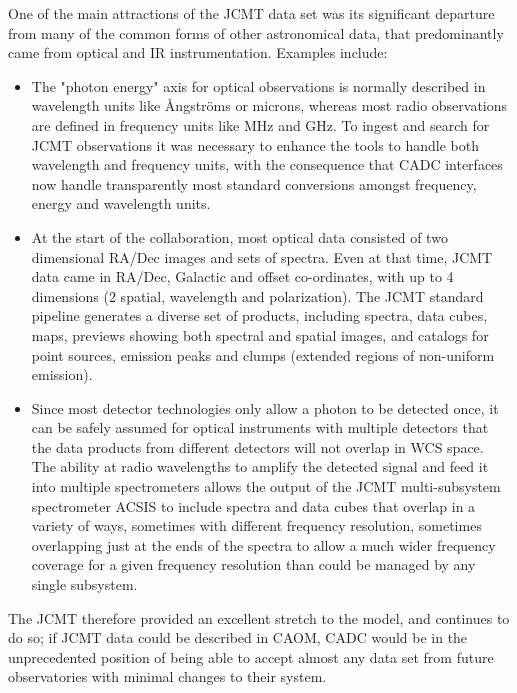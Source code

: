 \documentclass[final,authoryear,5p,times,twocolumn]{elsarticle}
\begin{document}
One of the main attractions of the JCMT data set was its significant
departure from many of the common forms of other astronomical data,
that predominantly came from optical and IR instrumentation.
Examples include:
\begin{itemize}
\item The "photon energy" axis for optical observations is normally described in wavelength
units like \AA{}ngstr\"{o}ms or microns, whereas most radio observations are defined in
frequency units like MHz and GHz.  To ingest and search for JCMT observations
it was necessary to enhance the tools to handle both wavelength and frequency units, with the
consequence that CADC interfaces now handle transparently most standard conversions
amongst frequency, energy and wavelength units.

\item At the start of the collaboration, most optical
data consisted of two dimensional RA/Dec images and sets of spectra.  Even at that time, JCMT data
came in RA/Dec, Galactic and offset co-ordinates, with up to 4 dimensions (2
spatial, wavelength and polarization).  The JCMT standard pipeline generates a
diverse set of products, including spectra, data cubes, maps, previews showing both spectral
and spatial images,  and catalogs for point sources, emission peaks and
clumps (extended regions of non-uniform emission).

\item Since most detector technologies only allow a photon to be
detected once, it can be safely assumed for optical instruments with multiple detectors
that the data products from different detectors will not overlap in WCS space.  The ability
at radio wavelengths to amplify the detected signal and feed it into multiple
spectrometers allows the output of the JCMT multi-subsystem spectrometer ACSIS
to include spectra and data cubes that overlap in a variety of ways, sometimes with
different frequency resolution, sometimes overlapping just at the ends of the spectra
to allow a much wider frequency coverage for a given frequency resolution than could be managed
by any single subsystem.
\end{itemize}

The JCMT therefore
provided an excellent stretch to the model, and continues to do so; if JCMT data could be
described in CAOM, CADC would be in the unprecedented position of
being able to accept almost any data set from future observatories
with minimal changes to their system.
\end{document}
